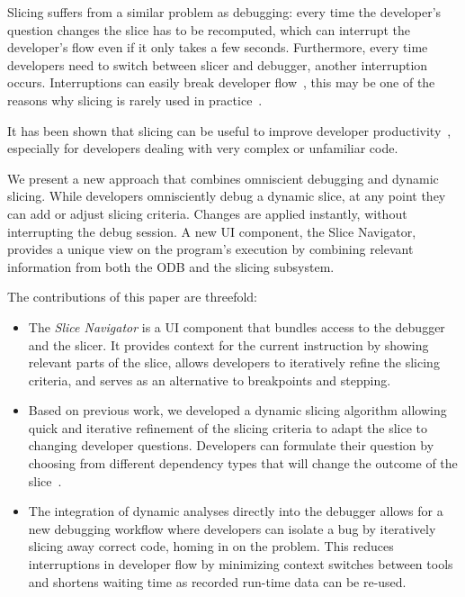 \documentclass[
			english,
			review,
			]{elsarticle}
\begin{document}
Slicing suffers from a similar problem as debugging:
every time the developer's question changes the slice has to be recomputed, which can interrupt the developer's flow even if it only takes a few seconds.
Furthermore, every time developers need to switch between slicer and debugger, another interruption occurs.
Interruptions can easily break developer flow~\cite{altmann_04_task_interruption_resumption_lag}, this may be one of the reasons why slicing is rarely used in practice~\cite{perscheid_studying_2017}.

It has been shown that slicing can be useful to improve developer productivity~\cite{weiser_programmers_1982, agrawal_dynamic_1990}, especially for developers dealing with very complex or unfamiliar code.

We present a new approach that combines omniscient debugging and dynamic slicing.
While developers omnisciently debug a dynamic slice, at any point they can add or adjust slicing criteria.
Changes are applied instantly, without interrupting the debug session.
A new UI component, the Slice Navigator, provides a unique view on the program's execution by combining relevant information from both the ODB and the slicing subsystem.

The contributions of this paper are threefold:
\begin{itemize}
	\item The \emph{Slice Navigator} is a UI component that bundles access to the debugger and the slicer.
		It provides context for the current instruction by showing relevant parts of the slice, allows developers to iteratively refine the slicing criteria, and serves as an alternative to breakpoints and stepping.
	\item Based on previous work, we developed a dynamic slicing algorithm allowing quick and iterative refinement of the slicing criteria to adapt the slice to changing developer questions.
		Developers can formulate their question by choosing from different dependency types that will change the outcome of the slice~\cite{treffer_dynamic_2014}.
	\item The integration of dynamic analyses directly into the debugger allows for a new debugging workflow where developers can isolate a bug by iteratively slicing away correct code, homing in on the problem.
	This reduces interruptions in developer flow by minimizing context switches between tools and shortens waiting time as recorded run-time data can be re-used.
\end{itemize}
\end{document}

